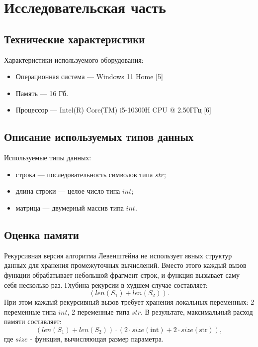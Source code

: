 \chapter{Исследовательская часть}

\section{Технические характеристики}
Характеристики используемого оборудования:
\begin{itemize}
    \item Операционная система --- Windows 11 Home [5]
    \item Память --- 16 Гб.
    \item Процессор --- Intel(R) Core(TM) i5-10300H CPU @ 2.50ГГц [6]
\end{itemize}

\section{Описание используемых типов данных}
Используемые типы данных:
\begin{itemize}
	\item строка --- последовательность символов типа $str$;
	\item длина строки --- целое число типа $int$;
	\item матрица --- двумерный массив типа $int$.
\end{itemize}

\section{Оценка памяти}

Рекурсивная версия алгоритма Левенштейна не использует явных структур данных для хранения промежуточных вычислений. Вместо этого каждый вызов функции обрабатывает небольшой фрагмент строк, и функция вызывает саму себя несколько раз. Глубина рекурсии в худшем случае составляет: 
\begin{equation}
	(len(S_{1}) + len(S_{2})).
\end{equation}
При этом каждый рекурсивный вызов требует хранения локальных переменных: 2 переменные типа $int$, 2 переменные типа $str$. В результате, максимальный расход памяти составляет:
\begin{equation}
	(len(S_{1}) + len(S_{2})) \cdot (2 \cdot size(\text{int}) + 2 \cdot size(\text{str})),
\end{equation}
где $size$ - функция, вычисляющая размер параметра.

